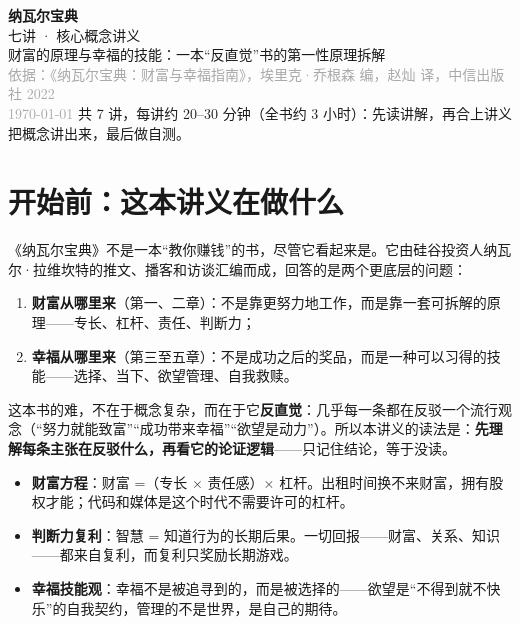 \documentclass[UTF8,a4paper,11pt]{ctexart}
\begin{document}
\begin{center}
  \vspace*{2cm}
  {\Huge\bfseries\color{accent} 纳瓦尔宝典}\\[0.4cm]
  {\LARGE 七讲 · 核心概念讲义}\\[1.2cm]
  {\large 财富的原理与幸福的技能：一本“反直觉”书的第一性原理拆解}\\[0.5cm]
  {\small\textcolor{darkgray}{依据：《纳瓦尔宝典：财富与幸福指南》，埃里克·乔根森 编，赵灿 译，中信出版社 2022}}\\[0.3cm]
  {\small\textcolor{darkgray}{\today}}
  \vfill
  {\small 共 7 讲，每讲约 20–30 分钟（全书约 3 小时）：先读讲解，再合上讲义把概念讲出来，最后做自测。}
\end{center}
\newpage

\tableofcontents
\newpage

\section*{开始前：这本讲义在做什么}

《纳瓦尔宝典》不是一本“教你赚钱”的书，尽管它看起来是。它由硅谷投资人纳瓦尔·拉维坎特的推文、播客和访谈汇编而成，回答的是两个更底层的问题：

\begin{enumerate}
  \item \textbf{财富从哪里来}（第一、二章）：不是靠更努力地工作，而是靠一套可拆解的原理——专长、杠杆、责任、判断力；
  \item \textbf{幸福从哪里来}（第三至五章）：不是成功之后的奖品，而是一种可以习得的技能——选择、当下、欲望管理、自我救赎。
\end{enumerate}

这本书的难，不在于概念复杂，而在于它\textbf{反直觉}：几乎每一条都在反驳一个流行观念（“努力就能致富”“成功带来幸福”“欲望是动力”）。所以本讲义的读法是：\textbf{先理解每条主张在反驳什么，再看它的论证逻辑}——只记住结论，等于没读。

\begin{keyconcept}[七讲要带走的三样工具]
\begin{itemize}
  \item \textbf{财富方程}：财富 =（专长 $\times$ 责任感）$\times$ 杠杆。出租时间换不来财富，拥有股权才能；代码和媒体是这个时代不需要许可的杠杆。
  \item \textbf{判断力复利}：智慧 = 知道行为的长期后果。一切回报——财富、关系、知识——都来自复利，而复利只奖励长期游戏。
  \item \textbf{幸福技能观}：幸福不是被追寻到的，而是被选择的——欲望是“不得到就不快乐”的自我契约，管理的不是世界，是自己的期待。
\end{itemize}
\end{keyconcept}
\end{document}
